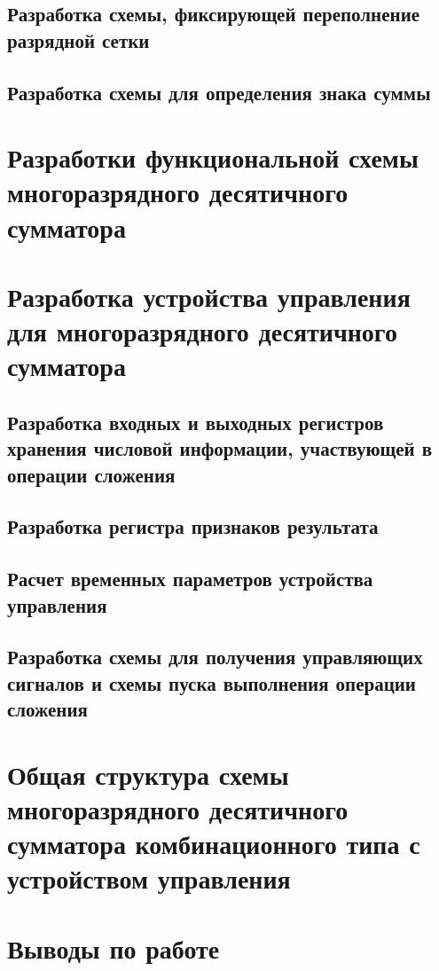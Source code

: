 \documentclass[a4paper,14pt]{article}
\begin{document}
\subsection{Разработка схемы, фиксирующей переполнение разрядной сетки}

\subsection{Разработка схемы для определения знака суммы}

\section{Разработки функциональной схемы многоразрядного десятичного сумматора}

\section{Разработка устройства управления для многоразрядного десятичного сумматора}

\subsection{Разработка входных и выходных регистров хранения числовой информации, участвующей в операции сложения}

\subsection{Разработка регистра признаков результата}

\subsection{Расчет временных параметров устройства управления}

\subsection{Разработка схемы для получения управляющих сигналов и схемы пуска выполнения операции сложения}

\section{Общая структура схемы многоразрядного десятичного сумматора комбинационного типа с устройством управления}

\section{Выводы по работе}
\end{document}
